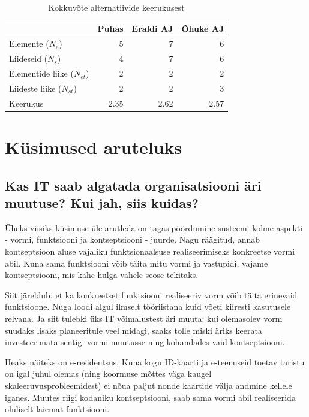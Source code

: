 \documentclass{tufte-book}
\begin{document}
\begin{table}
	\begin{center}
		\begin{tabular}{p{3.6 cm}rrr}
		\toprule
& Puhas & Eraldi AJ & Õhuke AJ \\
		\midrule
Elemente ($N_e$) &	5 &	7 &	6\\
Liideseid  ($N_s$)	& 4 &	7 &	6\\
Elementide liike  ($N_{et}$)&	2	&2	&2\\
Liideste liike  ($N_{st}$)&	2 &	2 &	3\\
		\midrule
Keerukus &	2.35 &	2.62	 &2.57\\
		\bottomrule
		\end{tabular}
		\caption{Kokkuvõte alternatiivide keerukusest}
		\label{tab:complexity}

	\end{center}
\end{table}


\section{Küsimused aruteluks}
\subsection{Kas IT saab algatada organisatsiooni äri muutuse? Kui jah, siis kuidas?}
Üheks viisiks küsimuse üle arutleda on tagasipöördumine süsteemi kolme aspekti - vormi, funktsiooni ja kontseptsiooni - juurde. Nagu räägitud, annab kontseptsioon aluse vajaliku funktsionaalsuse realiseerimiseks konkreetse vormi abil. Kuna sama funktsiooni võib täita mitu vormi ja vastupidi, vajame kontseptsiooni, mis kahe hulga vahele seose tekitaks. 

Siit järeldub, et ka konkreetset funktsiooni realiseeriv vorm võib täita erinevaid funktsioone. Nuga loodi algul ilmselt tööriistana kuid võeti kiiresti kasutusele relvana. Ja siit tulebki üks IT võimalustest äri muuta: kui olemasolev vorm suudaks lisaks planeeritule veel midagi, saaks tolle miski äriks keerata investeerimata sentigi vormi muutusse ning kohandades vaid kontseptsiooni. 

Heaks näiteks on e-residentsus. Kuna kogu ID-kaarti ja e-teenuseid toetav taristu on igal juhul olemas (ning koormuse mõttes väga kaugel skaleeruvusprobleemidest) ei nõua paljut nonde kaartide välja andmine kellele iganes. Muutes riigi kodaniku kontseptsiooni, saab sama vormi abil realiseerida oluliselt laiemat funktsiooni. 
\end{document}
